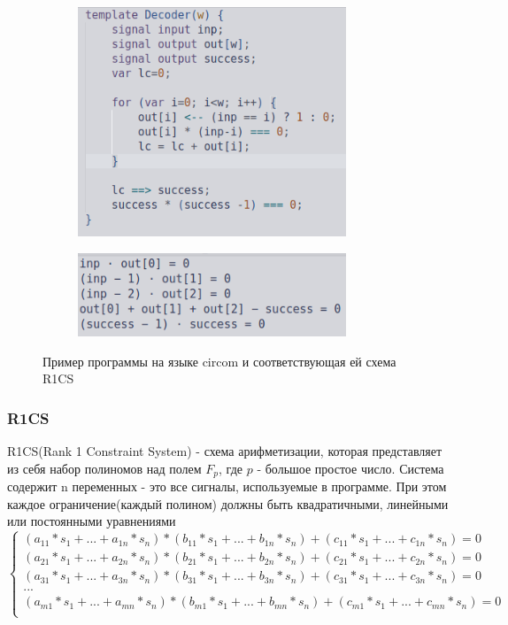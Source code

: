\documentclass[a4paper]{article}
\begin{document}
\begin{figure}[!htb]
    \begin{subfigure}{0.48\linewidth}\includegraphics[width=0.88\textwidth]{circom_example_code.png}
    \end{subfigure}
    \begin{subfigure}{0.48\linewidth}\includegraphics[width=0.88\textwidth]{r1cs_example.png}
    \end{subfigure}
    \caption{Пример программы на языке circom и соответствующая ей схема R1CS}
    \label{broken_example}
 \end{figure}

\subsubsection{R1CS}
\indent
R1CS(Rank 1 Constraint System) - схема арифметизации, которая представляет из себя набор полиномов над полем $F_p$, где $p$ - большое простое число. Система содержит n переменных - это все сигналы, используемые в программе. При этом каждое ограничение(каждый полином) должны быть квадратичными, линейными или постоянными уравнениями
\[
    \begin{cases} 
    (a_{11}*s_1 + ... + a_{1n}*s_n)*(b_{11}*s_1 + ... + b_{1n}*s_n) + (c_{11}*s_1 + ... + c_{1n}*s_n) = 0\\
    (a_{21}*s_1 + ... + a_{2n}*s_n)*(b_{21}*s_1 + ... + b_{2n}*s_n) + (c_{21}*s_1 + ... + c_{2n}*s_n) = 0\\
    (a_{31}*s_1 + ... + a_{3n}*s_n)*(b_{31}*s_1 + ... + b_{3n}*s_n) + (c_{31}*s_1 + ... + c_{3n}*s_n) = 0\\
    ...\\
    (a_{m1}*s_1 + ... + a_{mn}*s_n)*(b_{m1}*s_1 + ... + b_{mn}*s_n) + (c_{m1}*s_1 + ... + c_{mn}*s_n) = 0\\
    \end{cases}
\]
\end{document}

